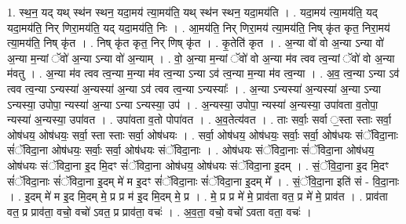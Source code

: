 \documentclass[17pt]{extarticle}
\begin{document}
1. स्थ॒न॒ यद् यथ् स्थ॑न स्थन॒ यदा॒मय॑ त्या॒मय॑ति॒ यथ् स्थ॑न स्थन॒ यदा॒मय॑ति । . यदा॒मय॑ त्या॒मय॑ति॒ यद् यदा॒मय॑ति॒ निर् णिरा॒मय॑ति॒ यद् यदा॒मय॑ति॒ निः । . आ॒मय॑ति॒ निर् णिरा॒मय॑ त्या॒मय॑ति॒ निष् कृ॑त कृत॒ निरा॒मय॑ त्या॒मय॑ति॒ निष् कृ॑त । . निष् कृ॑त कृत॒ निर् णिष् कृ॑त । . कृ॒तेति॑ कृत । . अ॒न्या वो॑ वो अ॒न्या ऽन्या वो॑ अ॒न्या म॒न्यां ॅवो॑ अ॒न्या ऽन्या वो॑ अ॒न्याम् । . वो॒ अ॒न्या म॒न्यां ॅवो॑ वो अ॒न्या म॑व त्वव त्व॒न्यां ॅवो॑ वो अ॒न्या म॑वतु । . अ॒न्या म॑व त्वव त्व॒न्या म॒न्या म॑व त्व॒न्या ऽन्या ऽव॑ त्व॒न्या म॒न्या म॑व त्व॒न्या । . अ॒व॒ त्व॒न्या ऽन्या ऽव॑ त्वव त्व॒न्या ऽन्यस्या॑ अ॒न्यस्या॑ अ॒न्या ऽव॑ त्वव त्व॒न्या ऽन्यस्याः᳚ । . अ॒न्या ऽन्यस्या॑ अ॒न्यस्या॑ अ॒न्या ऽन्या ऽन्यस्या॒ उपोपा॒ न्यस्या॑ अ॒न्या ऽन्या ऽन्यस्या॒ उप॑ । . अ॒न्यस्या॒ उपोपा॒ न्यस्या॑ अ॒न्यस्या॒ उपा॑वता व॒तोपा॒ न्यस्या॑ अ॒न्यस्या॒ उपा॑वत । . उपा॑वता व॒तो पोपा॑वत । . अ॒व॒तेत्य॑वत । . ताः सर्वाः॒ सर्वा ॒स्ता स्ताः सर्वा॒ ओष॑धय॒ ओष॑धयः॒ सर्वा॒ स्ता स्ताः सर्वा॒ ओष॑धयः । . सर्वा॒ ओष॑धय॒ ओष॑धयः॒ सर्वाः॒ सर्वा॒ ओष॑धयः संॅविदा॒नाः सं॑ॅविदा॒ना ओष॑धयः॒ सर्वाः॒ सर्वा॒ ओष॑धयः संॅविदा॒नाः । . ओष॑धयः संॅविदा॒नाः सं॑ॅविदा॒ना ओष॑धय॒ ओष॑धयः संॅविदा॒ना इ॒द मि॒दꣳ सं॑ॅविदा॒ना ओष॑धय॒ ओष॑धयः संॅविदा॒ना इ॒दम् । . सं॒ॅवि॒दा॒ना इ॒द मि॒दꣳ सं॑ॅविदा॒नाः सं॑ॅविदा॒ना इ॒दम् मे॑ म इ॒दꣳ सं॑ॅविदा॒नाः सं॑ॅविदा॒ना इ॒दम् मे᳚ । . सं॒ॅवि॒दा॒ना इति॑ सं - वि॒दा॒नाः । . इ॒दम् मे॑ म इ॒द मि॒दम् मे॒ प्र प्र म॑ इ॒द मि॒दम् मे॒ प्र । . मे॒ प्र प्र मे॑ मे॒ प्राव॑ता वत॒ प्र मे॑ मे॒ प्राव॑त । . प्राव॑ता वत॒ प्र प्राव॑ता॒ वचो॒ वचो॑ ऽवत॒ प्र प्राव॑ता॒ वचः॑ । . अ॒व॒ता॒ वचो॒ वचो॑ ऽवता वता॒ वचः॑ । \newline
\end{document}
